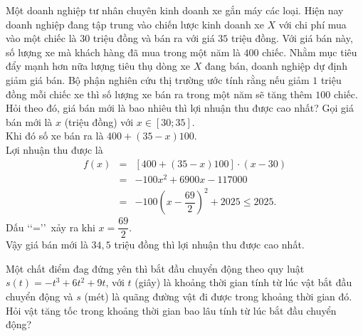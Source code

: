 \begin{ex}%
Một doanh nghiệp tư nhân chuyên kinh doanh xe gắn máy các loại. Hiện nay doanh nghiệp đang tập trung vào chiến lược kinh doanh xe $X$ với chi phí mua vào một chiếc là $30$ triệu đồng và bán ra với giá $35$ triệu đồng. Với giá bán này, số lượng xe mà khách hàng đã mua trong một năm là $400$ chiếc. Nhằm mục tiêu đẩy mạnh hơn nữa lượng tiêu thụ dòng xe $X$ đang bán, doanh nghiệp dự định giảm giá bán. Bộ phận nghiên cứu thị trường ước tính rằng nếu giảm $1$ triệu đồng mỗi chiếc xe thì số lượng xe bán ra trong một năm sẽ tăng thêm $100$ chiếc. Hỏi theo đó, giá bán mới là bao nhiêu thì lợi nhuận thu được cao nhất?
\loigiai
{
	Gọi giá bán mới là $x$ (triệu đồng) với $x\in [30;35]$.\\
	Khi đó số xe bán ra là $400+(35-x)100$.\\
	Lợi nhuận thu được là \begin{eqnarray*}
	f(x)&=&[400+(35-x)100] \cdot(x-30)\\
	&=&-100x^2+6900x-117000 \\
	&=&-100\left(x-\dfrac{69}{2}\right)^2+2025 \leq 2025.
	\end{eqnarray*}
	Dấu \lq \lq=\rq \rq~xảy ra khi $x=\dfrac{69}{2}$.\\
	Vậy giá bán mới là $34{,}5$ triệu đồng thì lợi nhuận thu được cao nhất.
}
\end{ex}

\begin{ex}%
	Một chất điểm đag đứng yên thì bắt đầu chuyển động theo quy luật $s(t)=-t^3+6t^2+9t$, với $t$ (giây) là khoảng thời gian tính từ lúc vật bắt đầu chuyển động và $s$ (mét) là quãng đường vật đi được trong khoảng thời gian đó. Hỏi vật tăng tốc trong khoảng thời gian bao lâu tính từ lúc bắt đầu chuyển động?
\end{ex}

